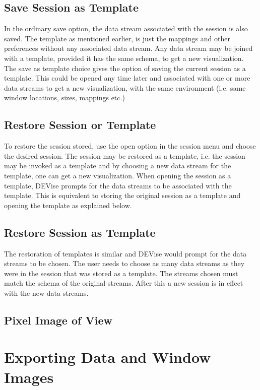 \subsection{Save Session as Template}

In the ordinary save option, the data stream associated with the
session is also saved. The template as mentioned earlier, is just the
mappings and other preferences without any associated data stream. Any
data stream may be joined with a template, provided it has the same
schema, to get a new visualization. The save as template choice gives
the option of saving the current session as a template. This could be
opened any time later and associated with one or more data streams to
get a new visualization, with the same environment (i.e. same window
locations, sizes, mappings etc.)

\subsection{Restore Session or Template}

To restore the session stored, use the open option in the session menu
and choose the desired session. The session may be restored as a
template, i.e. the session may be invoked as a template and by
choosing a new data stream for the template, one can get a new
visualization. When opening the session as a template, DEVise prompts
for the data streams to be associated with the template. This is
equivalent to storing the original session as a template and opening
the template as explained below.

\subsection{Restore Session as Template}

The restoration of templates is similar and DEVise would prompt for
the data streams to be chosen. The user needs to choose as many data
streams as they were in the session that was stored as a template. The
streams chosen must match the schema of the original streams. After
this a new session is in effect with the new data streams.

\subsection{Pixel Image of View}


\section{Exporting Data and Window Images}

